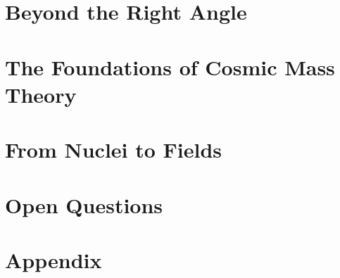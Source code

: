 \documentclass[ american, twoside,openright,titlepage,numbers=noenddot,
                headinclude,footinclude,cleardoublepage=empty,abstract=off,
                BCOR=5mm,paper=a4,fontsize=11pt
                ]{scrreprt}
\begin{document}
\frenchspacing
\raggedbottom
{}
\pagestyle{plain}



\cleardoublepage
\cleardoublepage
\cleardoublepage
\cleardoublepage

\cleardoublepage
\pagestyle{scrheadings}

\cleardoublepage
\part{Beyond the Right Angle}\label{pt:beyond}





\cleardoublepage
\part{The Foundations of Cosmic Mass Theory}\label{pt:foundations}




\cleardoublepage
\part{From Nuclei to Fields}\label{pt:nuclei-fields}



\cleardoublepage
\part{Open Questions}\label{pt:open}



\cleardoublepage


\appendix
\cleardoublepage
\part*{Appendix}







\cleardoublepage
\cleardoublepage
\end{document}
